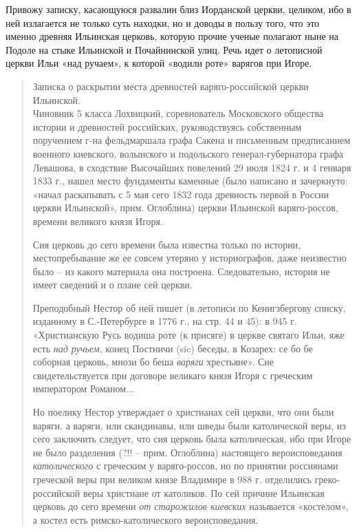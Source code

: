 Привожу записку, касающуюся развалин близ Иорданской церкви, целиком, ибо в ней излагается не только суть находки, но и доводы в пользу того, что это именно древняя Ильинская церковь, которую прочие ученые полагают ныне на Подоле на стыке Ильинской и Почайнинской улиц. Речь идет о летописной церкви Ильи «над ручаем», к которой «водили роте» варягов при Игоре.

\begin{quotation}
Записка о раскрытии места древностей варяго-российской церкви Ильинской.\\

Чиновник 5 класса Лохвицкий, соревнователь Московского общества истории и древностей российских, руководствуясь собственным поручением г-на фельдмаршала графа Сакена и письменным предписанием военного киевского, волынского и подольского генерал-губернатора графа Левашова, в сходствие Высочайших повелений 29 июля 1824 г. и 4 генваря 1833 г., нашел место фундаменты каменные (было написано и зачеркнуто: «начал раскапывать с 5 мая сего 1832 года древность первой в России церкви Ильинской», прим. Оглоблина) церкви Ильинской варяго-россов, времени великого князя Игоря.

Сия церковь до сего времени была известна только по истории, местопребывание же ее совсем утеряно у историографов, даже неизвестно было – из какого материала она построена. Следовательно, история не имеет сведений и о плане сей церкви.

Преподобный Нестор об ней пишет (в летописи по Кенигзбергову списку, изданному в С.-Петербурге в 1776 г., на стр. 44 и 45): в 945 г. «Христианскую Русь водиша роте (к присяге) в церкве святаго Ильи, яже есть \textit{над ручьем}, конец Постничи (sic) беседы, в Козарех: се бо бе соборная церковь, мнози бо беша \textit{варяги} хрестьяне». Сие свидетельствуется при договоре великаго князя Игоря с греческим императором Романом...

Но поелику Нестор утверждает о христианах сей церкви, что они были варяги, а варяги, или скандинавы, или шведы были католической веры, из сего заключить следует, что сия церковь была католическая, ибо при Игоре не было разделения (?!! – прим. Оглоблина) настоящего вероисповедания \textit{католического} с греческим у варяго-россов, но по принятии россиянами греческой веры при великом князе Владимире в 988 г. отделились греко-российской веры христиане от католиков. По сей причине Ильинская церковь до сего времени \textit{от старожилов киевских} называется «костелом», а костел есть римско-католического вероисповедания.


\end{quotation}

